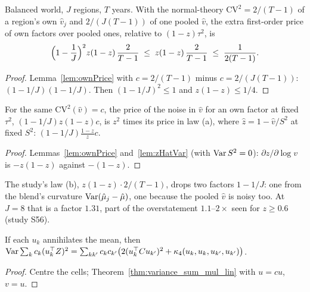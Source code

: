 \begin{theorem}\label{thm:ownPrice_balanced}
  \leanok
  Balanced world, $J$ regions, $T$ years. With the normal-theory $\mathrm{CV}^2 = 2/(T - 1)$ of a
  region's own $\hat v_j$ and $2/(J(T - 1))$ of one pooled $\hat v$, the extra first-order price of
  own factors over pooled ones, relative to $(1 - z)\tau^2$, is
  \[ \Bigl(1 - \frac1J\Bigr)^2 z(1 - z)\,\frac2{T - 1} \;\le\; z(1 - z)\,\frac2{T - 1}
     \;\le\; \frac1{2(T - 1)}. \]
\end{theorem}
\begin{proof}
  \leanok
  Lemma~\ref{lem:ownPrice} with $c = 2/(T - 1)$ minus $c = 2/(J(T - 1))$:
  $(1 - 1/J)(1 - 1/J)$. Then $(1 - 1/J)^2 \le 1$ and $z(1 - z) \le 1/4$.
\end{proof}
\begin{corollary}\label{cor:ownPrice_vs_bsPrice}
  \leanok
  For the same $\mathrm{CV}^2(\hat v) = c$, the price of the noise in $\hat v$ for an own factor at
  fixed $\tau^2$, $(1 - 1/J)z(1 - z)c$, is $z^2$ times its price in law (a), where
  $\hat z = 1 - \hat v/S^2$ at fixed $S^2$: $(1 - 1/J)\frac{1 - z}{z}c$.
\end{corollary}
\begin{proof}
  \leanok
  Lemmas~\ref{lem:ownPrice} and~\ref{lem:zHatVar} (with $\operatorname{Var} S^2 = 0$):
  $\partial z/\partial\log v$ is $-z(1 - z)$ against $-(1 - z)$.
\end{proof}
\begin{remark}
  The study's law (b), $z(1 - z)\cdot 2/(T - 1)$, drops two factors $1 - 1/J$: one from the blend's
  curvature $\operatorname{Var}(\hat\mu_j - \hat\mu)$, one because the pooled $\hat v$ is noisy too. At $J = 8$ that is a
  factor $1.31$, part of the overstatement $1.1$--$2\times$ seen for $z \ge 0.6$ (study S56).
\end{remark}

\begin{lemma}\label{lem:variance_sum_sq_lin}
  \leanok
  If each $u_k$ annihilates the mean, then
  $\operatorname{Var}\sum_k c_k(u_k^\top Z)^2 = \sum_{kk'} c_kc_{k'}\bigl(2(u_k^\top Cu_{k'})^2
  + \kappa_4(u_k, u_k, u_{k'}, u_{k'})\bigr)$.
\end{lemma}
\begin{proof}
  \leanok
  Centre the cells; Theorem~\ref{thm:variance_sum_mul_lin} with $u = cu$, $v = u$.
\end{proof}


